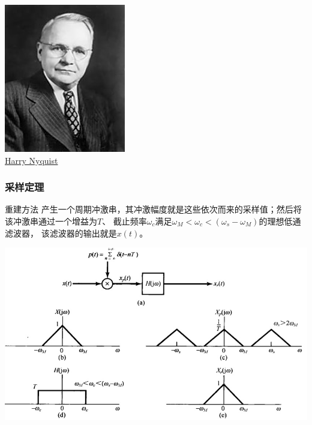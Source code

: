 \documentclass[CJKutf8,dvipsnames,table]{beamer}
\begin{document}
\begin{CJK*}{UTF8}{song}
\begin{frame}
    \begin{center}
      \includegraphics[scale=.5]{Harry_Nyquist} \\
      \href{https://en.wikipedia.org/wiki/Harry_Nyquist}{Harry Nyquist}      
    \end{center}
  \end{frame}  
       
  \begin{frame}
    \frametitle{采样定理}
	\begin{block}{重建方法}
		产生一个周期冲激串，其冲激幅度就是这些依次而来的采样值；然后将该冲激串通过一个增益为$T$、
		截止频率$\omega_c$满足$\omega_M < \omega_c < (\omega_s-\omega_M)$的理想低通滤波器，
		该滤波器的输出就是$x(t)$。
	\end{block}
    \begin{center}
      \includegraphics[scale=.3]{ss-c-f7-4}
    \end{center}
  \end{frame} 
         

\end{CJK*}
\end{document}
